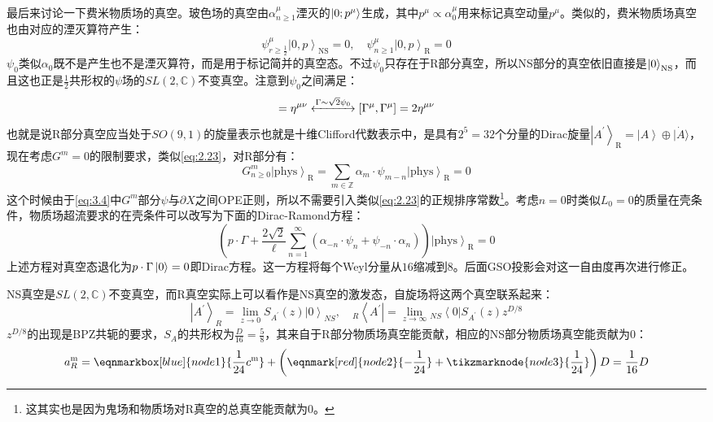 最后来讨论一下费米物质场的真空。玻色场的真空由$\alpha^\mu_{n\geq 1}$湮灭的$\ket{0;p^\mu}$生成，其中$p^\mu\propto\alpha^\mu_0$用来标记真空动量$p^\mu$。类似的，费米物质场真空也由对应的湮灭算符产生：
\begin{equation}
	\psi_{r\geq\frac12}^\mu\left|0,p\right\rangle_{\mathrm{NS}}=0,\quad \psi_{n\geq1}^\mu\left|0,p\right\rangle_{\mathrm{R}}=0
\end{equation}
$\psi_0$类似$\alpha_0$既不是产生也不是湮灭算符，而是用于标记简并的真空态。不过$\psi_0$只存在于R部分真空，所以NS部分的真空依旧直接是$\ket{0}_{\mathrm{NS}}$，而且这也正是$\frac12$共形权的$\psi$场的$SL(2,\mathbb{C})$不变真空。注意到$\psi_0$之间满足：
\begin{equation}
	[\psi_0^\mu,\psi_0^\nu]=\eta^{\mu\nu}
	\xleftrightarrow{\Gamma\sim\sqrt{2}\psi_0} [\Gamma^\mu,\Gamma^\mu]=2\eta^{\mu\nu}
\end{equation}
也就是说R部分真空应当处于$SO(9,1)$的旋量表示也就是十维Clifford代数表示中，是具有$2^5=32$个分量的Dirac旋量$\left|A^{\prime}\right\rangle_{\mathrm{R}}=\left|A\right\rangle\oplus|\dot A\rangle$，现在考虑$G^m=0$的限制要求，类似\ref{eq:2.23}，对R部分有：
\begin{equation}
	G^m_{n\geq0}\left|\mathrm{phys}\right\rangle_{\mathrm{R}}=\sum_{m\in\mathbb{Z}}\alpha_m\cdot\psi_{m-n}\left|\mathrm{phys}\right\rangle_{\mathrm{R}}=0
\end{equation}
这个时候由于\ref{eq:3.4}中$G^m$部分$\psi$与$\partial X$之间OPE正则，所以不需要引入类似\ref{eq:2.23}的正规排序常数\footnote{这其实也是因为鬼场和物质场对R真空的总真空能贡献为0。}。考虑$n=0$时类似$L_0=0$的质量在壳条件，物质场超流要求的在壳条件可以改写为下面的Dirac-Ramond方程：
\begin{equation}
	\left(p\cdot\Gamma+\frac{2\sqrt{2}}{\ell}\sum_{n=1}^\infty(\alpha_{-n}\cdot \psi_n+\psi_{-n}\cdot\alpha_n)\right)\left|\mathrm{phys}\right\rangle_{\mathrm{R}}=0
\end{equation}
上述方程对真空态退化为$p\cdot\Gamma\ket{0}=0$即Dirac方程。这一方程将每个Weyl分量从$16$缩减到$8$。后面GSO投影会对这一自由度再次进行修正。

NS真空是$SL(2,\mathbb{C})$不变真空，而R真空实际上可以看作是NS真空的激发态，自旋场将这两个真空联系起来：
\begin{equation}
	\left|A^{\prime}\right\rangle_{R}=\lim_{z\to 0}S_{{A^{\prime}}}(z)\left|0\right\rangle_{NS},\quad 
	{}_R\left\langle A^{\prime}\right|=\lim_{z\to\infty}{}_{NS}\left\langle0\right|S_{{A^{\prime}}}(z)z^{D/8}
\end{equation}
$z^{D/8}$的出现是BPZ共轭的要求\cite{itocft}，$S_A$的共形权为$\frac{D}{16}=\frac58$，其来自于R部分物质场真空能贡献，相应的NS部分物质场真空能贡献为0：
\vspace{4em}%
\begin{equation}
	\label{eq:3.12}
	a^{\mathrm{m}}_R=
	\eqnmarkbox[blue]{node1}{\frac{1}{24}c^{\mathrm{m}}}+
	\left(\eqnmark[red]{node2}{-\frac{1}{24}}+\tikzmarknode{node3}{\frac{1}{24}}\right)D=\frac{1}{16}D
\end{equation}
\vspace{1em}
